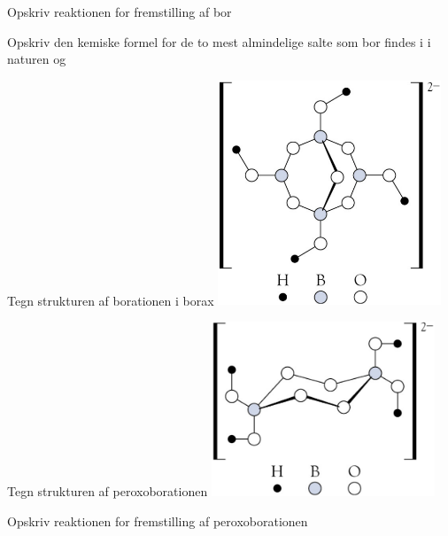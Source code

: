\begin{flashcard}[Fremstilling]{Opskriv reaktionen for fremstilling af bor}
\end{flashcard}

\begin{flashcard}[Fremstilling]{Opskriv den kemiske formel for de to mest almindelige salte som bor findes i i naturen}
 og 
\end{flashcard}

\begin{flashcard}[Struktur]{Tegn strukturen af borationen i borax}
\includegraphics[width=0.5\textwidth]{figures/k13s293Borax.png}
\end{flashcard}

\begin{flashcard}[Struktur]{Tegn strukturen af peroxoborationen}
\includegraphics[width=0.5\textwidth]{figures/k13s293Peroxoborat.png}
\end{flashcard}

\begin{flashcard}[Fremstilling]{Opskriv reaktionen for fremstilling af peroxoborationen}
\end{flashcard}

